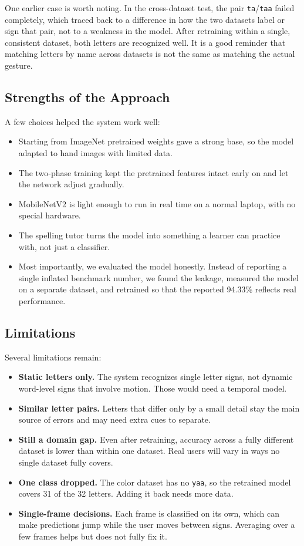One earlier case is worth noting. In the cross-dataset test, the pair
\texttt{ta}/\texttt{taa} failed completely, which traced back to a difference in how
the two datasets label or sign that pair, not to a weakness in the model. After
retraining within a single, consistent dataset, both letters are recognized well. It
is a good reminder that matching letters by name across datasets is not the same as
matching the actual gesture.

\subsection{Strengths of the Approach}
A few choices helped the system work well:
\begin{itemize}
  \item Starting from ImageNet pretrained weights gave a strong base, so the model
        adapted to hand images with limited data.
  \item The two-phase training kept the pretrained features intact early on and let
        the network adjust gradually.
  \item MobileNetV2 is light enough to run in real time on a normal laptop, with no
        special hardware.
  \item The spelling tutor turns the model into something a learner can practice
        with, not just a classifier.
  \item Most importantly, we evaluated the model honestly. Instead of reporting a
        single inflated benchmark number, we found the leakage, measured the model on
        a separate dataset, and retrained so that the reported 94.33\% reflects real
        performance.
\end{itemize}

\subsection{Limitations}
Several limitations remain:
\begin{itemize}
  \item \textbf{Static letters only.} The system recognizes single letter signs, not
        dynamic word-level signs that involve motion. Those would need a temporal
        model.
  \item \textbf{Similar letter pairs.} Letters that differ only by a small detail stay
        the main source of errors and may need extra cues to separate.
  \item \textbf{Still a domain gap.} Even after retraining, accuracy across a fully
        different dataset is lower than within one dataset. Real users will vary in
        ways no single dataset fully covers.
  \item \textbf{One class dropped.} The color dataset has no \texttt{yaa}, so the
        retrained model covers 31 of the 32 letters. Adding it back needs more data.
  \item \textbf{Single-frame decisions.} Each frame is classified on its own, which
        can make predictions jump while the user moves between signs. Averaging over a
        few frames helps but does not fully fix it.
\end{itemize}

